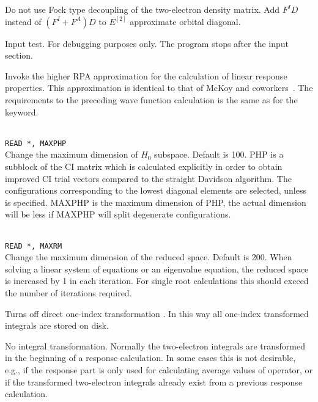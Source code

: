 \begin{description}

\item{}
Do not use Fock type decoupling of the two-electron density matrix.
Add $F^ID$ instead of $(F^I+F^A)D$ to $E^{[2]}$ approximate
orbital diagonal. 

\item{}
Input test. For debugging purposes only. The program stops after the
input section.

\item{}
Invoke the higher RPA approximation for the calculation of linear
response properties. This approximation is identical to that of McKoy
and coworkers~\cite{jrtsvmjcp58,tsjrvmjcp58}. The requirements to the
preceding wave function 
calculation is the same as for the  keyword.

\item{}\\
\verb|READ *, MAXPHP|\\
Change the maximum dimension of $H_0$ subspace.   Default is 100.
PHP is a subblock of the CI matrix which is calculated explicitly
in order to obtain improved CI trial vectors compared to the
straight Davidson algorithm\cite{erdjcp17}.  The configurations
corresponding to 
the lowest diagonal elements are selected, unless  is
specified. MAXPHP is the maximum dimension of PHP, the 
actual dimension will be less if MAXPHP will split degenerate configurations.
 
\item{}\\
\verb|READ *, MAXRM |\\
Change the maximum dimension of the reduced space. Default is 200.
When solving a linear system of equations or an eigenvalue equation,
the reduced space is increased by 1 in each iteration. For single root
calculations this should exceed the number of iterations required.

\item{}
Turns off direct one-index transformation \cite{ovhahjajjcc15}. 
In this way all one-index
transformed integrals are stored on disk.

\item{}
No integral transformation. Normally the two-electron integrals are 
transformed in the beginning of a response calculation. In some cases
this is not desirable, e.g., if the response part is only used for
calculating average values of operator, or if the transformed two-electron
integrals already exist from a previous response calculation. 


\end{description}
